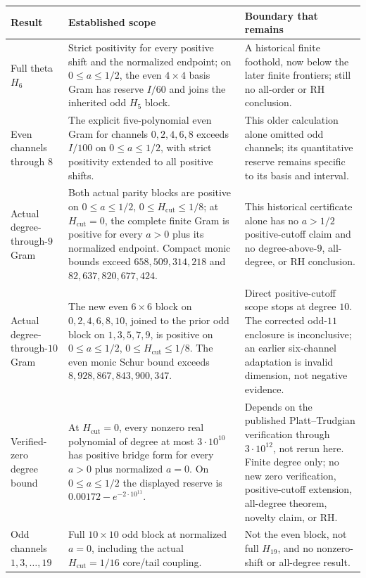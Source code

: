 \documentclass[11pt]{article}
\theoremstyle{definition}
\theoremstyle{remark}
\begin{document}
\begin{longtable}{>{\raggedright\arraybackslash}p{}
                  >{\raggedright\arraybackslash}p{}
                  >{\raggedright\arraybackslash}p{}}
\toprule
Result & Established scope & Boundary that remains \\
\midrule
\endhead
Full theta $H_6$ & Strict positivity for every positive shift and the normalized endpoint; on $0\le a\le1/2$, the even $4\times4$ basis Gram has reserve $I/60$ and joins the inherited odd $H_5$ block. & A historical finite foothold, now below the later finite frontiers; still no all-order or RH conclusion. \\
Even channels through $8$ & The explicit five-polynomial even Gram for channels $0,2,4,6,8$ exceeds $I/100$ on $0\le a\le1/2$, with strict positivity extended to all positive shifts. & This older calculation alone omitted odd channels; its quantitative reserve remains specific to its basis and interval. \\
Actual degree-through-$9$ Gram & Both actual parity blocks are positive on $0\le a\le1/2$, $0\le H_{\mathrm{cut}}\le1/8$; at $H_{\mathrm{cut}}=0$, the complete finite Gram is positive for every $a>0$ plus its normalized endpoint. Compact monic bounds exceed $658{,}509{,}314{,}218$ and $82{,}637{,}820{,}677{,}424$. & This historical certificate alone has no $a>1/2$ positive-cutoff claim and no degree-above-$9$, all-degree, or RH conclusion. \\
Actual degree-through-$10$ Gram & The new even $6\times6$ block on $0,2,4,6,8,10$, joined to the prior odd block on $1,3,5,7,9$, is positive on $0\le a\le1/2$, $0\le H_{\mathrm{cut}}\le1/8$. The even monic Schur bound exceeds $8{,}928{,}867{,}843{,}900{,}347$. & Direct positive-cutoff scope stops at degree $10$. The corrected odd-$11$ enclosure is inconclusive; an earlier six-channel adaptation is invalid dimension, not negative evidence. \\
Verified-zero degree bound & At $H_{\mathrm{cut}}=0$, every nonzero real polynomial of degree at most $3\cdot10^{10}$ has positive bridge form for every $a>0$ plus normalized $a=0$. On $0\le a\le1/2$ the displayed reserve is $0.00172-e^{-2\cdot10^{11}}$. & Depends on the published Platt--Trudgian verification through $3\cdot10^{12}$, not rerun here. Finite degree only; no new zero verification, positive-cutoff extension, all-degree theorem, novelty claim, or RH. \\
Odd channels $1,3,\ldots,19$ & Full $10\times10$ odd block at normalized $a=0$, including the actual $H_{\mathrm{cut}}=1/16$ core/tail coupling. & Not the even block, not full $H_{19}$, and no nonzero-shift or all-degree result. \\

\end{longtable}
\end{document}

